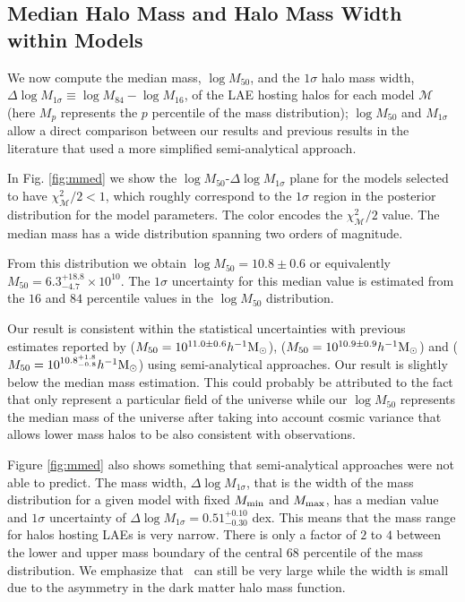 \documentclass{emulateapj}
\newcommand{\hMsun}{{\ifmmode{h^{-1}{\rm {M_{\odot}}}}\else{$h^{-1}{\rm{M_{\odot}}}$}\fi}}
\newcommand{\mmin}{{\ifmmode{{M_{\rm min}}}\else{${M_{\rm min}}$}\fi}}
\newcommand{\mmax}{{\ifmmode{{M_{\rm max}}}\else{${M_{\rm max}}$}\fi}}
\begin{document}
\subsection{Median Halo Mass and Halo Mass Width within Models}

We now compute the median mass, $\log M_{50}$, and the $1\sigma$ halo mass
width, $\Delta \log M_{1\sigma} \equiv \log M_{84} - \log M_{16}$, of the
LAE hosting halos for each model  $\mathcal{M}$ (here $M_{p}$
represents the $p$ percentile of the mass distribution); $\log M_{50}$
and $M_{1\sigma}$ allow a direct comparison between our results and
previous results in the literature
\citep[e.g.][]{Hayashino2004,Gawiser2007,Ouchi2010,Bielby16} that used
a more simplified semi-analytical approach. 

In Fig. \ref{fig:mmed} we show the $\log M_{50}$-$\Delta \log M_{1\sigma}$
plane for the models selected to have $\chi^{2}_{\mathcal{M}}/2 < 1$,
which roughly correspond to the $1\sigma$ region in the posterior
distribution for the model parameters. The color encodes the
$\chi^{2}_{\mathcal{M}}/2$ value. The median mass has a wide distribution
spanning two orders of magnitude.

From this distribution we obtain $\log M_{50} = 10.8\pm 0.6$ or
equivalently $M_{50} = 6.3^{+18.8}_{-4.7}\times 10^{10}$\hMsun.  
The $1\sigma$ uncertainty for this median value is estimated from the
$16$ and $84$ percentile values in the $\log M_{50}$ distribution.  

Our result is consistent within the statistical uncertainties with
previous estimates reported by
 \citet{Bielby16} ($M_{50} = 10^{11.0\pm0.6} \hMsun$),
 \citet{Gawiser07} ($M_{50}= 10^{10.9\pm0.9} \hMsun$) and
 \citet{Ouchi2010} ($M_{50} = 10^{10.8^{+1.8}_{-0.8}} \hMsun$) 
using semi-analytical approaches.   Our result is slightly below the  \citet{Bielby16}
 median mass estimation. This could probably be attributed to the fact that  \citet{Bielby16}
only represent a particular field of the universe while our $\log M_{50}$  represents the
median mass of the universe after taking into account cosmic variance that allows lower mass 
halos to be also consistent with observations.



Figure \ref{fig:mmed} also shows something 
that semi-analytical approaches were not able to predict.
The mass width, $\Delta \log M_{1\sigma}$, that is the width of the mass
distribution for a given model with fixed $\mmin$ and $\mmax$, has a
median value and $1\sigma$ uncertainty of $\Delta \log M_{1\sigma} =
0.51^{+0.10}_{-0.30}$ dex.
This means that the mass range for halos hosting LAEs is very narrow.
There is only a factor of $2$ to $4$ between the lower and upper mass
boundary of the central 68 percentile of the mass distribution. 
We emphasize that \mmax\ can still be very large while the width is
small due to the asymmetry in the dark matter halo mass function. 
\end{document}
